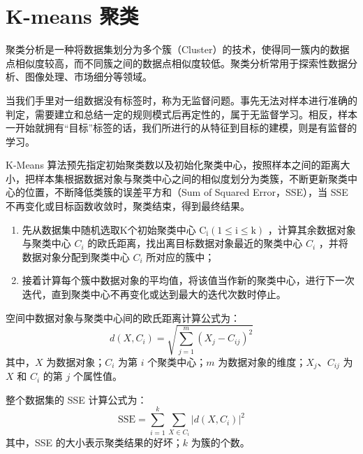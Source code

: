 \section{K-means 聚类}

\begin{definition}[聚类分析]
    聚类分析是一种将数据集划分为多个簇（Cluster）的技术，使得同一簇内的数据点相似度较高，而不同簇之间的数据点相似度较低。聚类分析常用于探索性数据分析、图像处理、市场细分等领域。
\end{definition}

\begin{definition}[无监督问题与有监督问题]
    当我们手里对一组数据没有标签时，称为无监督问题。事先无法对样本进行准确的判定，需要建立和总结一定的规则模式后再定性的，属于无监督学习。相反，样本一开始就拥有“目标”标签的话，我们所进行的从特征到目标的建模，则是有监督的学习。
\end{definition}

\begin{definition}[K-Means 算法]
    K-Means 算法预先指定初始聚类数以及初始化聚类中心，按照样本之间的距离大小，把样本集根据数据对象与聚类中心之间的相似度划分为类簇，不断更新聚类中心的位置，不断降低类簇的误差平方和（Sum of Squared Error，SSE），当 SSE 不再变化或目标函数收敛时，聚类结束，得到最终结果。

    \begin{enumerate}
        \item 先从数据集中随机选取K个初始聚类中心 $\mathrm{C_i}(1 \leq \mathrm{i} \leq \mathrm{k})$ ，计算其余数据对象与聚类中心 $C_i$ 的欧氏距离，找出离目标数据对象最近的聚类中心 $C_i$ ，并将数据对象分配到聚类中心 $C_i$ 所对应的簇中；
        \item 接着计算每个簇中数据对象的平均值，将该值当作新的聚类中心，进行下一次迭代，直到聚类中心不再变化或达到最大的迭代次数时停止。
    \end{enumerate}

    空间中数据对象与聚类中心间的欧氏距离计算公式为：
    $$
        d\left(X, C_i\right)=\sqrt{\sum_{j=1}^m\left(X_j-C_{i j}\right)^2}
    $$
    其中，$X$ 为数据对象；$C_i$ 为第 $i$ 个聚类中心；$m$ 为数据对象的维度；$X_j 、 C_{ij}$ 为 $X$ 和 $C_i$ 的第 $j$ 个属性值。

    整个数据集的 SSE 计算公式为：
    $$
        \mathrm{SSE}=\sum_{i=1}^k \sum_{X \in C_i}\left|d\left(X, C_i\right)\right|^2
    $$
    其中，SSE 的大小表示聚类结果的好坏；$k$ 为簇的个数。
\end{definition}

\begin{figure} [H]
    \centering
    \resizebox{0.5\textwidth}{!}{}
\end{figure}

